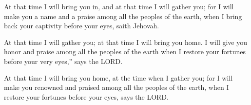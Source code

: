 			\begin{versebox}
					\item[BHS] 
					\item[LXX] 
					\item[ASV] At that time I will bring you in, and at that time I will gather you; for I will make you a name and a praise among all the peoples of the earth, when I bring back your captivity before your eyes, saith Jehovah.
					\item[NIV] At that time I will gather you; at that time I will bring you home. I will give you honor and praise among all the peoples of the earth when I restore your fortunes before your very eyes,” says the LORD.
					\item[NRSV] At that time I will bring you home, at the time when I gather you; for I will make you renowned and praised among all the peoples of the earth, when I restore your fortunes before your eyes, says the LORD.
			\end{versebox}
